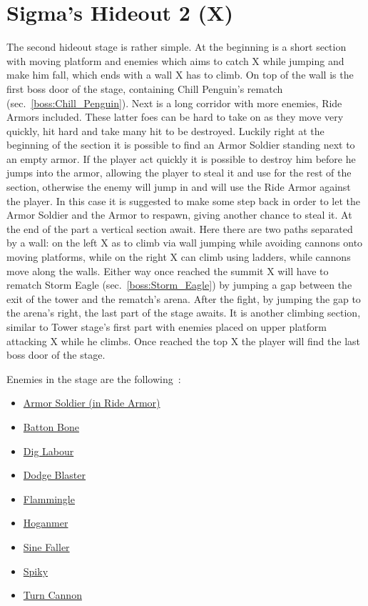 \chapter{Sigma's Hideout 2 (X)}
The second hideout stage is rather simple. At the beginning is a short section with moving platform and enemies which aims to catch X while jumping and make him fall, which ends with a wall X has to climb. On top of the wall is the first boss door of the stage, containing Chill Penguin's rematch (sec.~\ref{boss:Chill_Penguin}). Next is a long corridor with more enemies, Ride Armors included. These latter foes can be hard to take on as they move very quickly, hit hard and take many hit to be destroyed. Luckily right at the beginning of the section it is possible to find an Armor Soldier standing next to an empty armor. If the player act quickly it is possible to destroy him before he jumps into the armor, allowing the player to steal it and use for the rest of the section, otherwise the enemy will jump in and will use the Ride Armor against the player. In this case it is suggested to make some step back in order to let the Armor Soldier and the Armor to respawn, giving another chance to steal it. At the end of the part a vertical section await. Here there are two paths separated by a wall: on the left X as to climb via wall jumping while avoiding cannons onto moving platforms, while on the right X can climb using ladders, while cannons move along the walls. Either way once reached the summit X will have to rematch Storm Eagle (sec.~\ref{boss:Storm_Eagle}) by jumping a gap between the exit of the tower and the rematch's arena. After the fight, by jumping the gap to the arena's right, the last part of the stage awaits. It is another climbing section, similar to Tower stage's first part with enemies placed on upper platform attacking X while he climbs. Once reached the top X the player will find the last boss door of the stage.

Enemies in the stage are the following~\cite{wiki:sigma_stages}:
\begin{itemize}
	\item \hyperlink{enem:Armor_Soldier}{Armor Soldier (in Ride Armor)}
	\item \hyperlink{enem:Batton_Bone}{Batton Bone}
	\item \hyperlink{enem:Dig_Labour}{Dig Labour}
	\item \hyperlink{enem:Dodge_Blaster}{Dodge Blaster}
	\item \hyperlink{enem:Flammingle}{Flammingle}
	\item \hyperlink{enem:Hoganmer}{Hoganmer}
	\item \hyperlink{enem:Sine_Faller}{Sine Faller}
	\item \hyperlink{enem:Spiky}{Spiky}
	\item \hyperlink{enem:Turn_Cannon}{Turn Cannon}
\end{itemize} 

